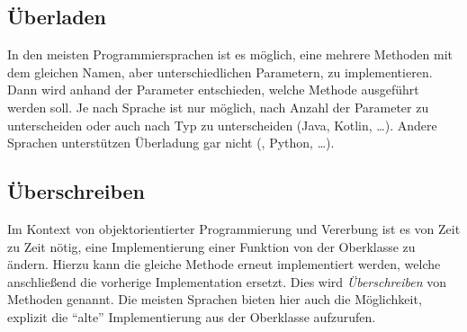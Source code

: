 \subsection{Überladen} \functionalMark \imperativeMark \oopMark
	In den meisten Programmiersprachen ist es möglich, eine mehrere Methoden mit dem gleichen Namen, aber unterschiedlichen Parametern, zu implementieren. Dann wird anhand der Parameter entschieden, welche Methode ausgeführt werden soll. Je nach Sprache ist nur möglich, nach Anzahl der Parameter zu unterscheiden oder auch nach Typ zu unterscheiden (Java, Kotlin, \dots). Andere Sprachen unterstützen Überladung gar nicht (\racket, Python, \dots).

\subsection{Überschreiben} \oopMark
	Im Kontext von objektorientierter Programmierung und Vererbung ist es von Zeit zu Zeit nötig, eine Implementierung einer Funktion von der Oberklasse zu ändern. Hierzu kann die gleiche Methode erneut implementiert werden, welche anschließend die vorherige Implementation ersetzt. Dies wird \textit{Überschreiben} von Methoden genannt. Die meisten Sprachen bieten hier auch die Möglichkeit, explizit die \enquote{alte} Implementierung aus der Oberklasse aufzurufen.
